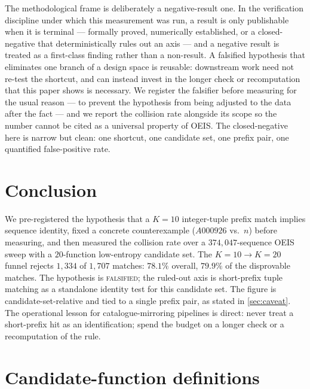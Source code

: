 \documentclass[11pt,a4paper]{article}
\newcommand{\Kten}{K\!=\!10}
\newcommand{\Ktwenty}{K\!=\!20}
\theoremstyle{definition}
\begin{document}
The methodological frame is deliberately a negative-result one. In the
verification discipline under which this measurement was run, a result is only
publishable when it is terminal --- formally proved, numerically established,
or a closed-negative that deterministically rules out an axis --- and a
negative result is treated as a first-class finding rather than a non-result. A
falsified hypothesis that eliminates one branch of a design space is reusable:
downstream work need not re-test the shortcut, and can instead invest in the
longer check or recomputation that this paper shows is necessary. We register
the falsifier before measuring for the usual reason --- to prevent the
hypothesis from being adjusted to the data after the fact --- and we report the
collision rate alongside its scope so the number cannot be cited as a universal
property of OEIS. The closed-negative here is narrow but clean: one shortcut,
one candidate set, one prefix pair, one quantified false-positive rate.

\section{Conclusion}
\label{sec:conclusion}

We pre-registered the hypothesis that a $\Kten$ integer-tuple prefix match
implies sequence identity, fixed a concrete counterexample ($A000926$ vs.\ $n$)
before measuring, and then measured the collision rate over a
$374{,}047$-sequence OEIS sweep with a $20$-function low-entropy candidate set.
The $\Kten\!\to\!\Ktwenty$ funnel rejects $1{,}334$ of $1{,}707$ matches:
$78.1\%$ overall, $79.9\%$ of the disprovable matches. The hypothesis is
\textsc{falsified}; the ruled-out axis is short-prefix tuple matching as a
standalone identity test for this candidate set. The figure is
candidate-set-relative and tied to a single prefix pair, as stated in
\textsection\ref{sec:caveat}. The operational lesson for catalogue-mirroring
pipelines is direct: never treat a short-prefix hit as an identification; spend
the budget on a longer check or a recomputation of the rule.

\appendix

\section{Candidate-function definitions}
\label{app:defs}
\end{document}
